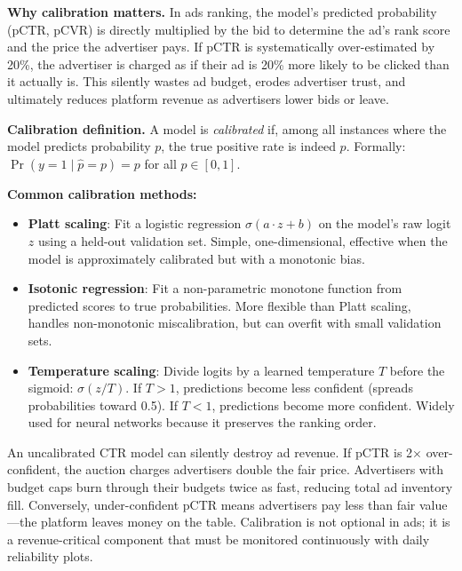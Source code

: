 \textbf{Why calibration matters.} In ads ranking, the model's predicted probability (pCTR, pCVR) is directly multiplied by the bid to determine the ad's rank score and the price the advertiser pays. If pCTR is systematically over-estimated by 20\%, the advertiser is charged as if their ad is 20\% more likely to be clicked than it actually is. This silently wastes ad budget, erodes advertiser trust, and ultimately reduces platform revenue as advertisers lower bids or leave.

\textbf{Calibration definition.} A model is \textit{calibrated} if, among all instances where the model predicts probability $p$, the true positive rate is indeed $p$. Formally: $\Pr(y=1 \mid \hat{p} = p) = p$ for all $p \in [0,1]$.

\textbf{Common calibration methods:}
\begin{itemize}
    \item \textbf{Platt scaling}: Fit a logistic regression $\sigma(a \cdot z + b)$ on the model's raw logit $z$ using a held-out validation set. Simple, one-dimensional, effective when the model is approximately calibrated but with a monotonic bias.
    \item \textbf{Isotonic regression}: Fit a non-parametric monotone function from predicted scores to true probabilities. More flexible than Platt scaling, handles non-monotonic miscalibration, but can overfit with small validation sets.
    \item \textbf{Temperature scaling}: Divide logits by a learned temperature $T$ before the sigmoid: $\sigma(z / T)$. If $T > 1$, predictions become less confident (spreads probabilities toward 0.5). If $T < 1$, predictions become more confident. Widely used for neural networks because it preserves the ranking order.
\end{itemize}

\begin{warningbox}
An uncalibrated CTR model can silently destroy ad revenue. If pCTR is 2$\times$ over-confident, the auction charges advertisers double the fair price. Advertisers with budget caps burn through their budgets twice as fast, reducing total ad inventory fill. Conversely, under-confident pCTR means advertisers pay less than fair value---the platform leaves money on the table. Calibration is not optional in ads; it is a revenue-critical component that must be monitored continuously with daily reliability plots.
\end{warningbox}

